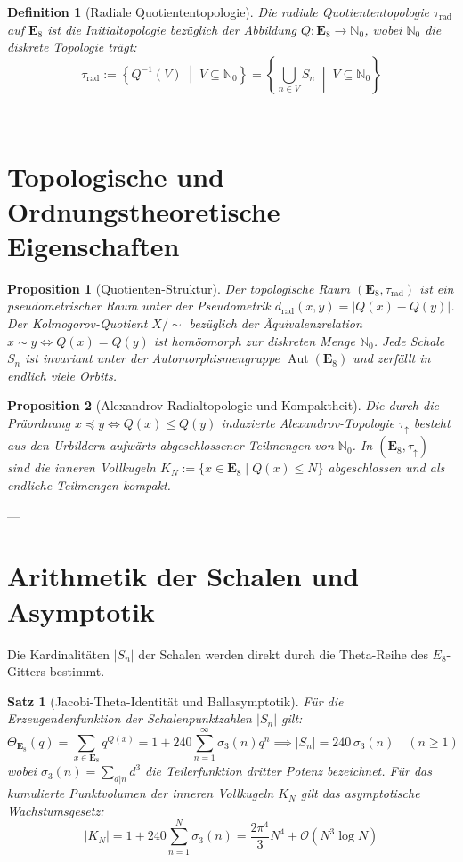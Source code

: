 \documentclass[11pt,a4paper]{article}
\newtheorem{definition}{Definition}
\newtheorem{proposition}{Proposition}
\newtheorem{theorem}{Satz}
\begin{document}
	\begin{definition}[Radiale Quotiententopologie]
		Die radiale Quotiententopologie $\tau_{\text{rad}}$ auf $\mathbf{E}_8$ ist die Initialtopologie bezüglich der Abbildung $Q: \mathbf{E}_8 \to \mathbb{N}_0$, wobei $\mathbb{N}_0$ die diskrete Topologie trägt:
		$$\tau_{\text{rad}} := \left\{ Q^{-1}(V) \;\middle|\; V \subseteq \mathbb{N}_0 \right\} = \left\{ \bigcup_{n \in V} S_n \;\middle|\; V \subseteq \mathbb{N}_0 \right\}$$
	\end{definition}
	
	---
	
	\section{Topologische und Ordnungstheoretische Eigenschaften}
	
	\begin{proposition}[Quotienten-Struktur]
		Der topologische Raum $(\mathbf{E}_8, \tau_{\text{rad}})$ ist ein pseudometrischer Raum unter der Pseudometrik $d_{\text{rad}}(x,y) = |Q(x) - Q(y)|$. Der Kolmogorov-Quotient $X / \sim$ bezüglich der Äquivalenzrelation $x \sim y \iff Q(x) = Q(y)$ ist homöomorph zur diskreten Menge $\mathbb{N}_0$. Jede Schale $S_n$ ist invariant unter der Automorphismengruppe $\operatorname{Aut}(\mathbf{E}_8)$ und zerfällt in endlich viele Orbits.
	\end{proposition}
	
	\begin{proposition}[Alexandrov-Radialtopologie und Kompaktheit]
		Die durch die Präordnung $x \preceq y \iff Q(x) \le Q(y)$ induzierte Alexandrov-Topologie $\tau_{\uparrow}$ besteht aus den Urbildern aufwärts abgeschlossener Teilmengen von $\mathbb{N}_0$. In $(\mathbf{E}_8, \tau_{\uparrow})$ sind die inneren Vollkugeln $K_N := \{x \in \mathbf{E}_8 \mid Q(x) \le N\}$ abgeschlossen und als endliche Teilmengen kompakt.
	\end{proposition}
	
	---
	
	\section{Arithmetik der Schalen und Asymptotik}
	
	Die Kardinalitäten $|S_n|$ der Schalen werden direkt durch die Theta-Reihe des $E_8$-Gitters bestimmt.
	
	\begin{theorem}[Jacobi-Theta-Identität und Ballasymptotik]
		Für die Erzeugendenfunktion der Schalenpunktzahlen $|S_n|$ gilt:
		$$\Theta_{\mathbf{E}_8}(q) = \sum_{x \in \mathbf{E}_8} q^{Q(x)} = 1 + 240 \sum_{n=1}^{\infty} \sigma_3(n) q^n \implies |S_n| = 240 \, \sigma_3(n) \quad (n \ge 1)$$
		wobei $\sigma_3(n) = \sum_{d|n} d^3$ die Teilerfunktion dritter Potenz bezeichnet. Für das kumulierte Punktvolumen der inneren Vollkugeln $K_N$ gilt das asymptotische Wachstumsgesetz:
		$$|K_N| = 1 + 240 \sum_{n=1}^{N} \sigma_3(n) = \frac{2\pi^4}{3} N^4 + \mathcal{O}(N^3 \log N)$$
	\end{theorem}
	
\end{document}
